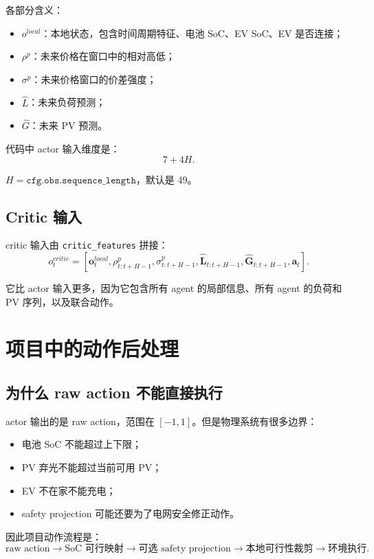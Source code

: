 \documentclass[UTF8,zihao=-4]{ctexart}
\begin{document}
各部分含义：
\begin{itemize}
  \item $o^{local}$：本地状态，包含时间周期特征、电池 SoC、EV SoC、EV 是否连接；
  \item $\rho^p$：未来价格在窗口中的相对高低；
  \item $\sigma^p$：未来价格窗口的价差强度；
  \item $\hat L$：未来负荷预测；
  \item $\hat G$：未来 PV 预测。
\end{itemize}

代码中 actor 输入维度是：
\begin{equation}
7+4H.
\end{equation}

$H=\texttt{cfg.obs.sequence\_length}$，默认是 49。

\subsection{Critic 输入}

critic 输入由 \texttt{critic\_features} 拼接：
\begin{equation}
o^{critic}_t
=
\left[
\bm{o}^{local}_t,
\rho^p_{t:t+H-1},
\sigma^p_{t:t+H-1},
\hat{\bm L}_{t:t+H-1},
\hat{\bm G}_{t:t+H-1},
\bm a_t
\right].
\end{equation}

它比 actor 输入更多，因为它包含所有 agent 的局部信息、所有 agent 的负荷和 PV 序列，以及联合动作。

\section{项目中的动作后处理}

\subsection{为什么 raw action 不能直接执行}

actor 输出的是 raw action，范围在 $[-1,1]$。但是物理系统有很多边界：
\begin{itemize}
  \item 电池 SoC 不能超过上下限；
  \item PV 弃光不能超过当前可用 PV；
  \item EV 不在家不能充电；
  \item safety projection 可能还要为了电网安全修正动作。
\end{itemize}

因此项目动作流程是：
\begin{equation}
\text{raw action}
\rightarrow
\text{SoC 可行映射}
\rightarrow
\text{可选 safety projection}
\rightarrow
\text{本地可行性裁剪}
\rightarrow
\text{环境执行}.
\end{equation}
\end{document}
